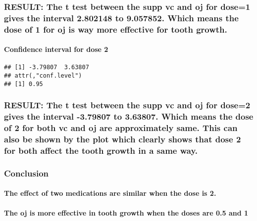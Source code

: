\documentclass[]{article}
\newenvironment{Shaded}{\begin{snugshade}}{\end{snugshade}}
\newcommand{\KeywordTok}[1]{\textcolor[rgb]{0.13,0.29,0.53}{\textbf{#1}}}
\newcommand{\DataTypeTok}[1]{\textcolor[rgb]{0.13,0.29,0.53}{#1}}
\newcommand{\DecValTok}[1]{\textcolor[rgb]{0.00,0.00,0.81}{#1}}
\newcommand{\OperatorTok}[1]{\textcolor[rgb]{0.81,0.36,0.00}{\textbf{#1}}}
\newcommand{\NormalTok}[1]{#1}
\let\oldparagraph\paragraph
\renewcommand{\paragraph}[1]{\oldparagraph{#1}\mbox{}}
\begin{document}
\subsubsection{RESULT: The t test between the supp vc and oj for dose=1
gives the interval 2.802148 to 9.057852. Which means the dose of 1 for
oj is way more effective for tooth
growth.}\label{result-the-t-test-between-the-supp-vc-and-oj-for-dose1-gives-the-interval-2.802148-to-9.057852.-which-means-the-dose-of-1-for-oj-is-way-more-effective-for-tooth-growth.}

\paragraph{Confidence interval for dose
2}\label{confidence-interval-for-dose-2}

\begin{Shaded}
\end{Shaded}

\begin{verbatim}
## [1] -3.79807  3.63807
## attr(,"conf.level")
## [1] 0.95
\end{verbatim}

\subsubsection{RESULT: The t test between the supp vc and oj for dose=2
gives the interval -3.79807 to 3.63807. Which means the dose of 2 for
both vc and oj are approximately same. This can also be shown by the
plot which clearly shows that dose 2 for both affect the tooth growth in
a same
way.}\label{result-the-t-test-between-the-supp-vc-and-oj-for-dose2-gives-the-interval--3.79807-to-3.63807.-which-means-the-dose-of-2-for-both-vc-and-oj-are-approximately-same.-this-can-also-be-shown-by-the-plot-which-clearly-shows-that-dose-2-for-both-affect-the-tooth-growth-in-a-same-way.}

\subsubsection{Conclusion}\label{conclusion}

\paragraph{The effect of two medications are similar when the dose is
2.}\label{the-effect-of-two-medications-are-similar-when-the-dose-is-2.}

\paragraph{The oj is more effective in tooth growth when the doses are
0.5 and
1}\label{the-oj-is-more-effective-in-tooth-growth-when-the-doses-are-0.5-and-1}
\end{document}

